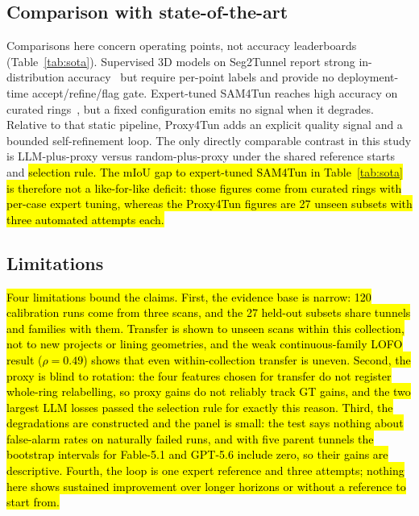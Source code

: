 \documentclass[a4paper,fleqn]{cas-dc}
\begin{document}
{\subsection{Comparison with state-of-the-art}\label{sec:positioning}

Comparisons here concern operating points, not accuracy leaderboards (Table~\ref{tab:sota}). Supervised 3D models on Seg2Tunnel report strong in-distribution accuracy~\cite{lin2024seg2tunnel} but require per-point labels and provide no deployment-time accept/refine/flag gate. Expert-tuned SAM4Tun reaches high accuracy on curated rings~\cite{ye2025sam4tun}, but a fixed configuration emits no signal when it degrades. Relative to that static pipeline, Proxy4Tun adds an explicit quality signal and a bounded self-refinement loop. The only directly comparable contrast in this study is LLM-plus-proxy versus random-plus-proxy under the shared reference starts and \hl{selection rule. The mIoU gap to expert-tuned SAM4Tun in Table~\ref{tab:sota} is therefore not a like-for-like deficit: those figures come from curated rings with per-case expert tuning, whereas the Proxy4Tun figures are 27 unseen subsets with three automated attempts each.}

\subsection{Limitations}\label{sec:limitations}

\hl{Four limitations bound the claims. First, the evidence base is narrow: 120 calibration runs come from three scans, and the 27 held-out subsets share tunnels and families with them. Transfer is shown to unseen scans within this collection, not to new projects or lining geometries, and the weak continuous-family LOFO result ($\rho=0.49$) shows that even within-collection transfer is uneven. Second, the proxy is blind to rotation: the four features chosen for transfer do not register whole-ring relabelling, so proxy gains do not reliably track GT gains, and the two largest LLM losses passed the selection rule for exactly this reason. Third, the degradations are constructed and the panel is small: the test says nothing about false-alarm rates on naturally failed runs, and with five parent tunnels the bootstrap intervals for Fable-5.1 and GPT-5.6 include zero, so their gains are descriptive. Fourth, the loop is one expert reference and three attempts; nothing here shows sustained improvement over longer horizons or without a reference to start from.}


}
\end{document}
